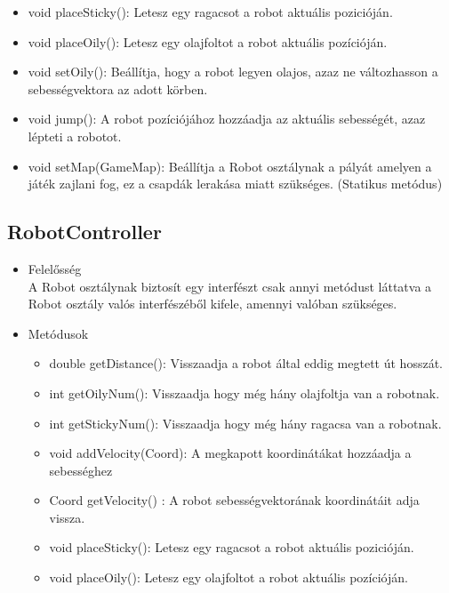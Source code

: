 \begin{itemize}
\begin{itemize}
		\item void placeSticky(): Letesz egy ragacsot a robot aktuális pozicióján.
		\item void placeOily(): Letesz egy olajfoltot a robot aktuális pozícióján.
		\item void setOily(): Beállítja, hogy a robot legyen olajos, azaz ne változhasson a sebességvektora az adott körben.
		\item void jump(): A robot pozíciójához hozzáadja az aktuális sebességét, azaz lépteti a robotot.
		\item void setMap(GameMap): Beállítja a Robot osztálynak a pályát amelyen a játék zajlani fog, ez a csapdák lerakása miatt szükséges. (Statikus metódus)
	\end{itemize}
\end{itemize}

\subsection{RobotController}
\begin{itemize}
	\item Felelősség\\
	A Robot osztálynak biztosít egy interfészt csak annyi metódust láttatva a Robot osztály valós interfészéből kifele, amennyi valóban szükséges.
	\item Metódusok
	\begin{itemize}
		\item double getDistance(): Visszaadja a robot által eddig megtett út hosszát.
		\item int getOilyNum(): Visszaadja hogy még hány olajfoltja van a robotnak.
		\item int getStickyNum(): Visszaadja hogy még hány ragacsa van a robotnak.
		\item void addVelocity(Coord): A megkapott koordinátákat hozzáadja a sebességhez
		\item Coord getVelocity() : A robot sebességvektorának koordinátáit adja vissza.
		\item void placeSticky(): Letesz egy ragacsot a robot aktuális pozicióján.
		\item void placeOily(): Letesz egy olajfoltot a robot aktuális pozícióján.
	\end{itemize}
\end{itemize}


